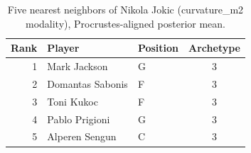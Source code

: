 \begin{table}[htbp]
  \centering\small
  \begin{tabular}{rllc}
    \toprule
    Rank & Player & Position & Archetype \\
    \midrule
    1 & Mark Jackson & G & 3 \\
    2 & Domantas Sabonis & F & 3 \\
    3 & Toni Kukoc & F & 3 \\
    4 & Pablo Prigioni & G & 3 \\
    5 & Alperen Sengun & C & 3 \\
    \bottomrule
  \end{tabular}
  \caption{Five nearest neighbors of Nikola Jokic (curvature_m2 modality), Procrustes-aligned posterior mean.}
  \label{tab:Nikola_Jokic_neighbors_curvature_m2}
\end{table}

